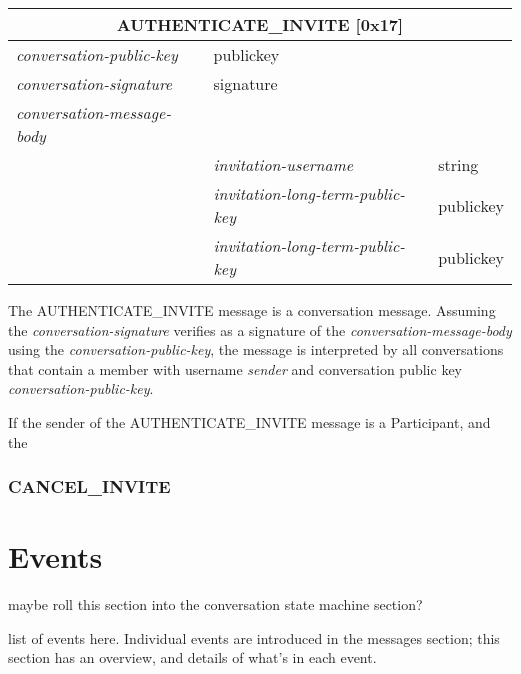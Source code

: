 \documentclass{article}
\def\field#1{\textit{#1}}
\begin{document}
\begin{tabular}{|l|l|l|}
\hline
\multicolumn{3}{|c|}{AUTHENTICATE\_INVITE [0x17]} \\
\hline
\hline
\field{conversation-public-key} & \multicolumn{2}{l|}{\textsf{publickey}} \\
\hline
\field{conversation-signature} & \multicolumn{2}{l|}{\textsf{signature}} \\
\hline
\field{conversation-message-body} & \multicolumn{2}{l|}{} \\
\hline
& \field{invitation-username} & \textsf{string} \\
\hline
& \field{invitation-long-term-public-key} & \textsf{publickey} \\
\hline
& \field{invitation-long-term-public-key} & \textsf{publickey} \\
\hline
\end{tabular}

The AUTHENTICATE\_INVITE message is a conversation message.
Assuming the \field{conversation-signature} verifies as a signature of the \field{conversation-message-body} using the \field{conversation-public-key}, the message is interpreted by all conversations that contain a member with username \field{sender} and conversation public key \field{conversation-public-key}.

If the sender of the AUTHENTICATE\_INVITE message is a Participant, and the 


\subsubsection{CANCEL\_INVITE}


\section{Events}
maybe roll this section into the conversation state machine section?

list of events here. Individual events are introduced in the messages section; this section has an overview, and details of what's in each event.




\end{document}

